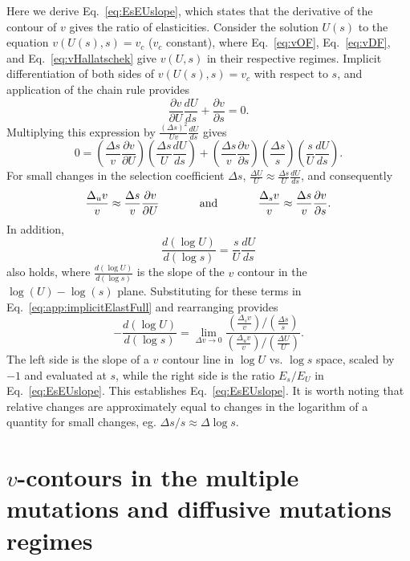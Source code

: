 \documentclass[11pt,onecolumn]{article}
\begin{document}
Here we derive Eq.~\eqref{eq:EsEUslope}, which states that the derivative of the contour of $v$ gives the ratio of elasticities. Consider the solution $U(s)$ to the equation $v(U(s),s)=v_{c}$ ($v_c$ constant), where Eq.~\eqref{eq:vOF}, Eq.~\eqref{eq:vDF}, and Eq.~\eqref{eq:vHallatschek} give $v(U,s)$ in their respective regimes. Implicit differentiation of both sides of $v(U(s),s)=v_c$ with respect to $s$, and application of the chain rule provides
\[
\frac{\partial v}{\partial U } \frac{d U}{d s} + \frac{\partial v}{\partial s } =0.
\]
Multiplying this expression by $\frac{(\Delta s)^2}{Uv} \frac{dU}{ds}$ gives 
\begin{equation} \label{eq:app:implicitElastFull}
0=
\left(\frac{\Delta s}{v}\frac{\partial v}{\partial U }\right) \left( \frac{\Delta s}{U}\frac{dU}{ds}\right)+\left(\frac{\Delta s}{v}\frac{\partial v}{\partial s} \right) \left( \frac{\Delta s}{s}\right) \left( \frac{s}{U}\frac{dU}{ds}\right).
\end{equation}
For small changes in the selection coefficient $\Delta s$, $\frac{\Delta U}{U} \approx \frac{\Delta s}{U}\frac{d U}{d s}$, and consequently
\[ 
\frac{\Delta_u v}{v} \approx \frac{\Delta s}{v}\frac{\partial v}{\partial U} \hspace{.5in} \text{and} \hspace{.5in}\frac{\Delta_s v}{v} \approx \frac{\Delta s}{v} \frac{\partial v}{\partial s}.
\]
In addition,
\begin{equation} \label{eq:app:dUdselasticities}
\frac{d (\log U)}{d (\log{s})} = \frac{s}{U}\frac{dU}{ds}
\end{equation}
also holds, where $\frac{d (\log U)}{d (\log{s})}$ is the slope of the $v$ contour in the $\log(U)-\log(s)$ plane. Substituting for these terms in Eq.~\eqref{eq:app:implicitElastFull} and rearranging provides 
\[
-\frac{d (\log U)}{d (\log{s})} = \lim_{\Delta v\rightarrow 0} \frac{\left ( \frac{\Delta_s v}{v}\right)/ \left(\frac{\Delta s}{s} \right) }{\left(\frac{\Delta_u v}{v}\right)/\left( \frac{\Delta U}{U}\right)}.
\]
The left side is the slope of a $v$ contour line in $\log U$ vs. $\log s$ space, scaled by $-1$ and evaluated at $s$, while the right side is the ratio $E_s/E_U$ in Eq.~\eqref{eq:EsEUslope}. This establishes Eq.~\eqref{eq:EsEUslope}. It is worth noting that relative changes are approximately equal to changes in the logarithm of a quantity for small changes, eg. $\Delta s/s \approx \Delta \log s$. 

\section{$v$-contours in the multiple mutations and diffusive mutations regimes} \label{sec:supp:paramVcontours}
\end{document}
